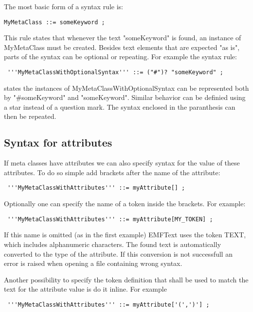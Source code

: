 The most basic form of a syntax rule is:

\begin{lstlisting}
MyMetaClass ::= someKeyword ;
\end{lstlisting}

This rule states that whenever the text "someKeyword" is found, an instance of
MyMetaClass must be created. Besides text elements that are expected "as is", parts 
of the syntax can be optional or repeating. For example the syntax rule:

\begin{lstlisting}
 '''MyMetaClassWithOptionalSyntax''' ::= ("#")? "someKeyword" ;
\end{lstlisting}

states the instances of MyMetaClassWithOptionalSyntax can be represented both by
"\#someKeyword" and "someKeyword". Similar behavior can be definied using a star 
instead of a question mark. The syntax enclosed in the paranthesis can then be 
repeated.

\subsection{Syntax for attributes}

If meta classes have attributes we can also specify syntax for the value of these attributes. To do so simple add brackets after the name of the attribute:

\begin{lstlisting}
 '''MyMetaClassWithAttributes''' ::= myAttribute[] ;
\end{lstlisting}

Optionally one can specify the name of a token inside the brackets. For example:

\begin{lstlisting}
 '''MyMetaClassWithAttributes''' ::= myAttribute[MY_TOKEN] ;
\end{lstlisting}

If this name is omitted (as in the first example) EMFText uses the token TEXT, which includes alphanumeric characters. The found text is automatically converted to the type of the attribute. If this conversion is not successfull an error is raised when opening a file containing wrong syntax.

Another possibility to specify the token definition that shall be used to match the text for the attribute value is do it inline. For example

\begin{lstlisting}
 '''MyMetaClassWithAttributes''' ::= myAttribute['(',')'] ;
\end{lstlisting}

